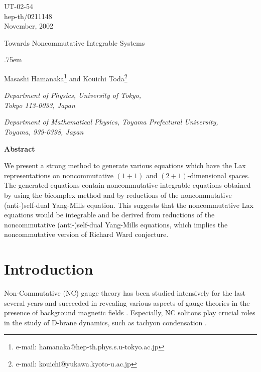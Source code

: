 \documentclass[a4paper,12pt]{article}\setlength{\topmargin}{-1cm}
\begin{document}
\begin{titlepage}
\null
\begin{flushright}
UT-02-54
\\
hep-th/0211148
\\
November, 2002
\end{flushright}

\vskip 1.5cm
\begin{center}

  {\LARGE Towards Noncommutative Integrable Systems}

\lineskip .75em
\vskip 2cm
\normalsize

  {\large Masashi Hamanaka\footnote{
e-mail: hamanaka@hep-th.phys.s.u-tokyo.ac.jp} and 
Kouichi Toda\footnote{e-mail: kouichi@yukawa.kyoto-u.ac.jp} }

\vskip 2cm

  {\it Department of Physics, University of Tokyo,\\
               Tokyo 113-0033, Japan}

\vskip 0.5cm

  {\it Department of Mathematical Physics,
Toyama Prefectural University,\\
Toyama, 939-0398, Japan}

\vskip 1.5cm

{\bf Abstract}

\end{center}

We present a strong method to generate various equations
which have the Lax representations 
on noncommutative $(1+1)$ and $(2+1)$-dimensional spaces. 
The generated equations contain noncommutative integrable
equations obtained by using the bicomplex method
and by reductions of the noncommutative
(anti-)self-dual Yang-Mills equation.
This suggests that
the noncommutative Lax equations would be integrable
and be derived from reductions of the noncommutative 
(anti-)self-dual Yang-Mills equations,
which implies the noncommutative version of Richard Ward conjecture.

\end{titlepage}

\clearpage

\baselineskip 6mm

\section{Introduction}

Non-Commutative (NC) gauge theory has been studied intensively 
for the last several years 
and succeeded in revealing various aspects of gauge theories
in the presence of background magnetic fields \cite{DoNe}. 
Especially,
NC solitons play crucial roles in the study of D-brane
dynamics, such as tachyon condensation \cite{Harvey}.
 
\end{document}
